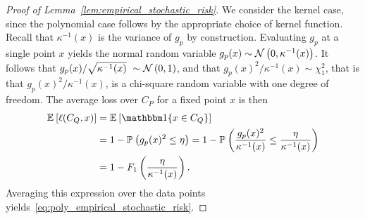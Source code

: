 \documentclass[onefignum,onetabnum]{siamart171218}
\begin{document}
\begin{proof}[Proof of Lemma~\ref{lem:empirical_stochastic_risk}]
    We consider the kernel case, since the polynomial case follows by the
    appropriate choice of kernel function.
    Recall that $\kappa^{-1}(x)$ is the variance of $g_p$ by construction.
    Evaluating $g_p$ at a single point $x$ yields the normal random variable
    $g_p(x)\sim\mathcal{N}\left(0, \kappa^{-1}(x)\right)$.
    It follows that $g_p(x)/\sqrt{\kappa^{-1}(x)}~\sim\mathcal{N}\left(0,1\right)$, and that
    $g_p(x)^2/\kappa^{-1}(x)\sim\chi^2_1$, that is that
    $g_p(x)^2/\kappa^{-1}(x)$, is a chi-square random variable with one degree
    of freedom. The average loss over $C_P$ for a fixed point $x$ is then
    \begin{equation}
       \begin{aligned}
           \label{eq:a}
           \Ex{\ell(C_Q,x)}&=\Ex{\ind{x\in C_Q}}\\
                           &= 1-\Pr{g_p(x)^2 \le \eta} 
                            = 1-\Pr{\frac{g_p(x)^2}{\kappa^{-1}(x)} \le \frac{\eta}{\kappa^{-1}(x)}}\\
                           &= 1 - F_1\left(\frac{\eta}{\kappa^{-1}(x)}\right).
       \end{aligned} 
    \end{equation}
    Averaging this expression over the data points yields~\eqref{eq:poly_empirical_stochastic_risk}.
\end{proof}
\end{document}
